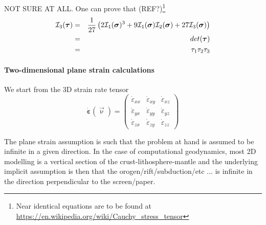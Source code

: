 \vspace{1cm}

{\color{gray} 
NOT SURE AT ALL. One can prove that (REF?)\footnote{Near identical equations are to be found at 
\url{https://en.wikipedia.org/wiki/Cauchy_stress_tensor}} 
\begin{eqnarray}
{\cal I}_3({\bm \tau}) 
&=& \frac{1}{27} \left( 2 {\cal I}_1({\bm \sigma})^3 + 
9 {\cal I}_1({\bm \sigma}) {\cal I}_2({\bm \sigma}) 
+27 {\cal I}_3({\bm \sigma})   \right) \nonumber\\
&=& det ({\bm\tau}) \nonumber\\
&=& \tau_1 \tau_2\tau_3 \nonumber
\end{eqnarray}
}

\paragraph{Two-dimensional plane strain calculations} 

We start from the 3D strain rate tensor 
\[
\dot{\bm \varepsilon}(\vec\upnu) = 
\left(
\begin{array}{ccc}
\dot{\varepsilon}_{xx} & \dot{\varepsilon}_{xy} & \dot{\varepsilon}_{xz} \\
\dot{\varepsilon}_{yx} & \dot{\varepsilon}_{yy} & \dot{\varepsilon}_{yz} \\
\dot{\varepsilon}_{zx} & \dot{\varepsilon}_{zy} & \dot{\varepsilon}_{zz} 
\end{array}
\right)
\]

The plane strain assumption is such that the problem at hand is assumed to be infinite in a given direction. 
In the case of computational geodynamics, most 2D modelling is a vertical section of the crust-lithosphere-mantle
and the underlying implicit assumption is then that the orogen/rift/subduction/etc ... is infinite in the 
direction perpendicular to the screen/paper.  


